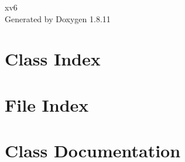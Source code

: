 \documentclass[twoside]{book}
\newcommand{\+}{\discretionary{\mbox{\scriptsize$\hookleftarrow$}}{}{}}
\newcommand{\clearemptydoublepage}{%
  \newpage{\pagestyle{empty}\cleardoublepage}%
}
\begin{document}
\hypersetup{pageanchor=false,
             bookmarksnumbered=true,
             pdfencoding=unicode
            }
\begin{titlepage}
\vspace*{7cm}
\begin{center}%
{\Large xv6 }\\
\vspace*{1cm}
{\large Generated by Doxygen 1.8.11}\\
\end{center}
\end{titlepage}
\clearemptydoublepage
\tableofcontents
\clearemptydoublepage
{}
\hypersetup{pageanchor=true}

\chapter{Class Index}

\chapter{File Index}

\chapter{Class Documentation}






























\end{document}
